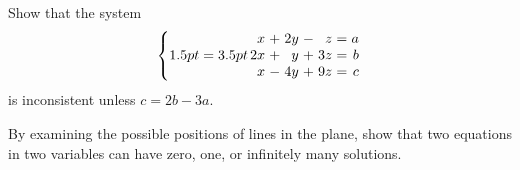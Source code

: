 \begin{multicols}{2}
\begin{ex}
\begin{sol}
\begin{enumerate}[label={\alph*.}]
\end{enumerate}
\end{sol}
\end{ex}

\begin{ex}
Show that the system 
\begin{equation*}  \left \{
\arraycolsep=3.5pt 
\begin{array}{rlrlrcr}
	 x & + & 2y & - &  z & = & a \\
	2x & + &  y & + & 3z & = & b \\
	 x & - & 4y & + & 9z & = & c
\end{array} \right. \end{equation*}
is inconsistent unless $c = 2b - 3a$.
\end{ex}

\begin{ex}
By examining the possible positions of lines in the plane, show that two equations in two variables can have zero, one, or infinitely many solutions.
\end{ex}
\end{multicols}

